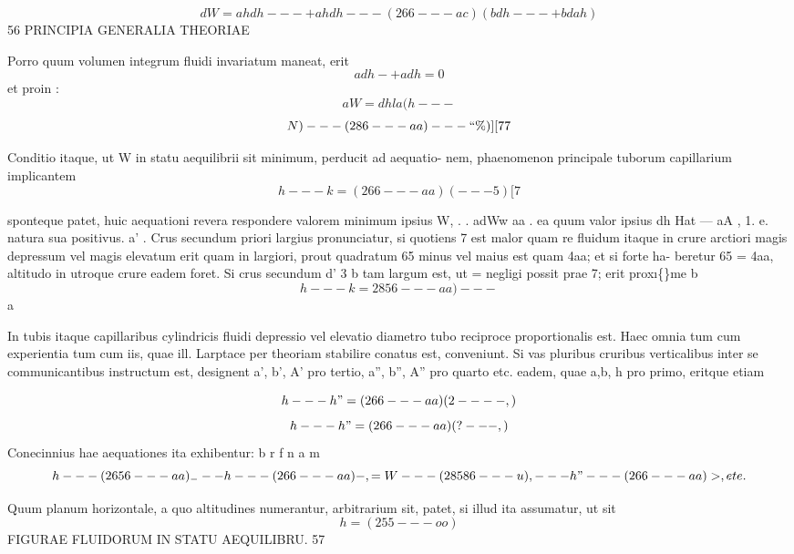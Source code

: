 \documentclass[12pt,a4paper]{article}
\begin{document}
\[                    dW = ahdh---+ahdh---(266--- ac) (bdh---+bdah)\]
56                                    PRINCIPIA GENERALIA THEORIAE

Porro quum volumen integrum fluidi invariatum maneat, erit
\[                                            adh-+adh =        0\]
et proin                                                                         :
\[                        aW = dhla(h---\]
\[                               N) ---(286--- aa) --- ``\%)]                        [77\]


Conditio itaque, ut W in statu aequilibrii sit minimum, perducit ad aequatio-
nem, phaenomenon principale tuborum capillarium implicantem
\[                                     h---k = (266---aa)(---5)       [7\]



sponteque patet, huic aequationi revera respondere valorem minimum ipsius W,
.  .  adWw              aa  .                 ea
quum valor ipsius dh Hat --- aA , 1. e. natura sua positivus.
a'      .
Crus secundum priori largius pronunciatur, si quotiens 7 est malor quam
re fluidum itaque in crure arctiori magis depressum vel magis elevatum erit quam
in largiori, prout quadratum 65 minus vel maius est quam 4aa; et si forte ha-
beretur    65 = 4aa,              altitudo in utroque crure eadem foret.             Si crus secundum
d'         3              b
tam largum est, ut           =     negligi possit prae   7;   erit prox\i\{\}me
b
\[                                           h---k=     2856 --- aa)---\]
a


In tubis itaque capillaribus cylindricis fluidi depressio vel elevatio diametro tubo
reciproce proportionalis est.              Haec omnia tum cum experientia tum cum iis, quae
ill. Larptace per theoriam stabilire conatus est, conveniunt.
Si vas pluribus cruribus verticalibus inter se communicantibus instructum
est, designent       a', b', A'       pro tertio,   a'', b'', A''     pro quarto etc. eadem,        quae
a,b, h pro primo, eritque etiam

\[                                    h---h" = (266---aa) (2----,)\]
\[                                    h---h" = (266---aa)(?---,)\]
Conecinnius hae aequationes ita exhibentur:
b       r                     f                       n         a               m
\[h--- (2656---aa)_ --- h--- (266 ---aa)-, = W--- (28586--- u), --- h" --- (266 ---aa)>,ete.\]

Quum planum horizontale, a quo altitudines numerantur,                       arbitrarium sit, patet,
si illud ita assumatur,           ut sit
\[                                            h= (255---oo)\]
FIGURAE FLUIDORUM IN STATU AEQUILIBRU.                              57
\end{document}
